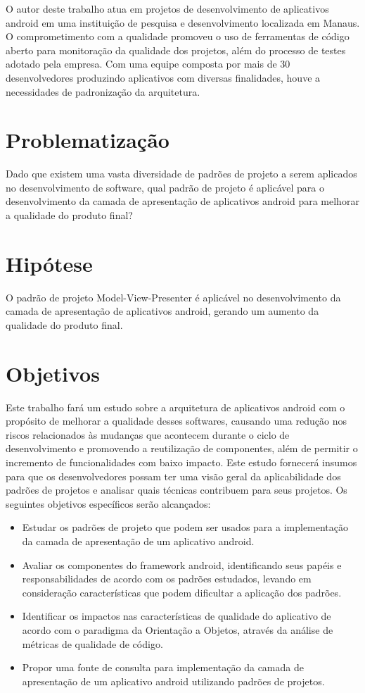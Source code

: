 O autor deste trabalho atua em projetos de desenvolvimento de aplicativos android em uma instituição de
pesquisa e desenvolvimento localizada em Manaus. O comprometimento com a
qualidade promoveu o uso de ferramentas de código aberto para monitoração da
qualidade dos projetos, além do processo de testes adotado pela empresa. Com uma
equipe composta por mais de 30 desenvolvedores produzindo aplicativos com
diversas finalidades, houve a necessidades de padronização da arquitetura.

\section{Problematização}
Dado que existem uma vasta diversidade de padrões de projeto a serem aplicados
no desenvolvimento de software, qual padrão de projeto é aplicável para o
desenvolvimento da camada de apresentação de aplicativos android para melhorar a
qualidade do produto final?

\section{Hipótese}

O padrão de projeto Model-View-Presenter é aplicável no desenvolvimento da
camada de apresentação de aplicativos android, gerando um aumento da qualidade
do produto final.

\section{Objetivos}

Este trabalho fará um estudo sobre a arquitetura de aplicativos android com o
propósito de melhorar a qualidade desses softwares, causando uma redução nos
riscos relacionados às mudanças que acontecem durante o ciclo de desenvolvimento
e promovendo a reutilização de componentes,  além de permitir o incremento de funcionalidades com
baixo impacto. Este estudo fornecerá insumos para que os desenvolvedores possam
ter uma visão geral da aplicabilidade dos padrões de projetos e analisar quais
técnicas contribuem para seus projetos. Os seguintes objetivos específicos serão alcançados:

\begin{itemize}
\item Estudar os padrões de projeto que podem ser usados para a implementação da
camada de apresentação de um aplicativo android.
\item Avaliar os componentes do  framework android, identificando seus papéis e
responsabilidades de acordo com os padrões estudados, levando  em consideração
características que podem dificultar a aplicação dos padrões. 
\item Identificar os impactos nas características de qualidade do aplicativo de acordo
com o paradigma da Orientação a Objetos, através da análise de métricas de qualidade de código.
\item Propor uma fonte de consulta para implementação da camada de
apresentação de um aplicativo android utilizando padrões de projetos.
\end{itemize}

